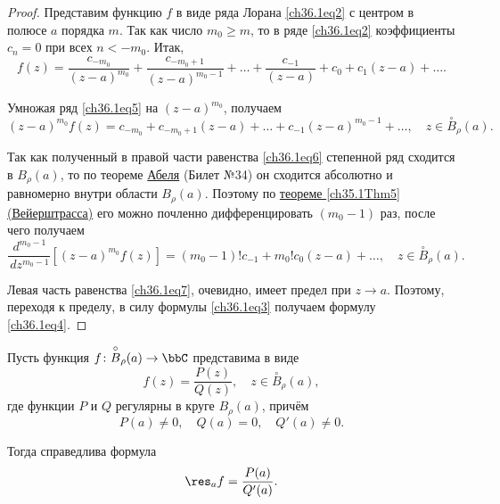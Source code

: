 \begin{proof}
Представим функцию $f$ в виде ряда Лорана \eqref{ch36.1eq2} с центром в полюсе $a$ порядка $m$. Так как число $m_0 \ge m$, то в ряде \eqref{ch36.1eq2} коэффициенты $c_n = 0$ при всех $n < -m_0$. Итак,
\begin{equation} \label{ch36.1eq5}
f(z) = \frac{c_{-m_0}}{(z - a)^{m_0}} + \frac{c_{-m_0 + 1}}{(z - a)^{m_0 - 1}} + \ldots + \frac{c_{-1}}{(z - a)} + c_0 + c_1 (z - a) + \ldots.
\end{equation}

Умножая ряд \eqref{ch36.1eq5} на $(z - a)^{m_0}$, получаем 
\begin{equation} \label{ch36.1eq6}
(z - a)^{m_0} f(z) = c_{-m_0} + c_{-m_0 + 1} (z - a) + \ldots + c_{-1} (z - a)^{m_0 - 1} + \ldots, \quad z \in \overset{\circ}{B}_\rho(a).
\end{equation}

Так как полученный в правой части равенства \eqref{ch36.1eq6} степенной ряд сходится в $B_\rho(a)$, то по теореме \hyperref[ch34.2Thm1]{Абеля} (Билет №34) он сходится абсолютно и равномерно внутри области $B_\rho(a)$. Поэтому по \hyperref[ch35.1Thm5]{теореме \ref{ch35.1Thm5} (Вейерштрасса)} его можно почленно дифференцировать $(m_0 - 1)$ раз, после чего получаем
\begin{equation} \label{ch36.1eq7}
\frac{\,d^{m_0 - 1}}{\,dz^{m_0 - 1}} [(z - a)^{m_0} f(z)] = (m_0 - 1)! c_{-1} + m_0! c_0 (z - a) + \ldots, \quad z \in \overset{\circ}{B}_\rho(a).
\end{equation}

Левая часть равенства \eqref{ch36.1eq7}, очевидно, имеет предел при $z \to a$. Поэтому, переходя к пределу, в силу формулы \eqref{ch36.1eq3} получаем формулу \eqref{ch36.1eq4}.
\end{proof}

\begin{lemm}
Пусть функция $f \colon \overset{\circ}{B}_\rho(a) \to \bbC$ представима в виде
$$
f(z) = \frac{P(z)}{Q(z)}, \quad z \in \overset{\circ}{B}_\rho(a),
$$
где функции $P$ и $Q$ регулярны в круге $B_\rho(a)$, причём
\begin{equation} \label{ch36.1eq8}
P(a) \not= 0, \quad Q(a) = 0, \quad Q'(a) \not= 0.
\end{equation}

Тогда справедлива формула
\begin{equation} \label{ch36.1eq9}
\res_{a} f = \frac{P(a)}{Q'(a)}.
\end{equation}

\end{lemm}

